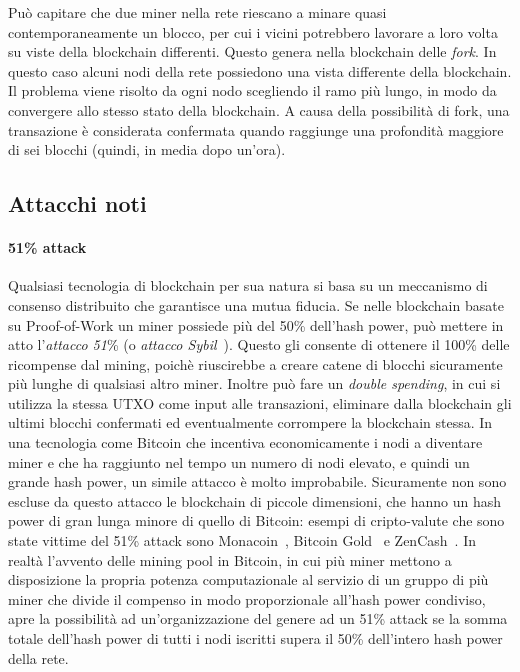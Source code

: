 Può capitare che due miner nella rete riescano a minare quasi contemporaneamente un blocco, per cui i vicini potrebbero lavorare a loro volta su viste della blockchain differenti. Questo genera nella blockchain delle \emph{fork}. In questo caso alcuni nodi della rete possiedono una vista differente della blockchain. Il problema viene risolto da ogni nodo scegliendo il ramo più lungo, in modo da convergere allo stesso stato della blockchain. A causa della possibilità di fork, una transazione è considerata confermata quando raggiunge una profondità maggiore di sei blocchi (quindi, in media dopo un'ora).


\subsection{Attacchi noti}\label{attacks}

\paragraph{51\% attack}
Qualsiasi tecnologia di blockchain per sua natura si basa su un meccanismo di consenso distribuito che garantisce una mutua fiducia. Se nelle blockchain basate su Proof-of-Work un miner possiede più del 50\% dell'hash power, può mettere in atto l'\textit{attacco 51}\% (o \emph{attacco Sybil}~\cite{douceur2002sybil}). Questo gli consente di ottenere il 100\% delle ricompense dal mining, poichè riuscirebbe a creare catene di blocchi sicuramente più lunghe di qualsiasi altro miner. Inoltre può fare un \emph{double spending}, in cui si utilizza la stessa UTXO come input alle transazioni, eliminare dalla blockchain gli ultimi blocchi confermati ed eventualmente corrompere la blockchain stessa.
In una tecnologia come Bitcoin che incentiva economicamente i nodi a diventare miner e che ha raggiunto nel tempo un numero di nodi elevato, e quindi un grande hash power, un simile attacco è molto improbabile. Sicuramente non sono escluse da questo attacco le blockchain di piccole dimensioni, che hanno un hash power di gran lunga minore di quello di Bitcoin: esempi di cripto-valute che sono state vittime del 51\% attack sono Monacoin~\cite{monacoin2018attack}, Bitcoin Gold~\cite{bitcoingold2020attack} e ZenCash~\cite{zencash2020attack}.
In realtà l'avvento delle mining pool in Bitcoin, in cui più miner mettono a disposizione la propria potenza computazionale al servizio di un gruppo di più miner che divide il compenso in modo proporzionale all'hash power condiviso, apre la possibilità ad un'organizzazione del genere ad un 51\% attack se la somma totale dell'hash power di tutti i nodi iscritti supera il 50\% dell'intero hash power della rete.

